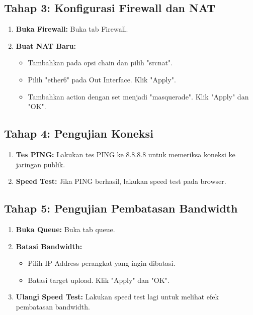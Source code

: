 \subsection*{Tahap 3: Konfigurasi Firewall dan NAT}

\begin{enumerate}
    \item \textbf{Buka Firewall:} Buka tab Firewall.
    \item \textbf{Buat NAT Baru:}
    \begin{itemize}
        \item Tambahkan pada opsi chain dan pilih "srcnat".
        \item Pilih "ether6" pada Out Interface. Klik "Apply".
        \item Tambahkan action dengan set menjadi "masquerade". Klik "Apply" dan "OK".
    \end{itemize}
\end{enumerate}

\subsection*{Tahap 4: Pengujian Koneksi}

\begin{enumerate}
    \item \textbf{Tes PING:} Lakukan tes PING ke 8.8.8.8 untuk memeriksa koneksi ke jaringan publik.
    \item \textbf{Speed Test:} Jika PING berhasil, lakukan speed test pada browser.
\end{enumerate}

\subsection*{Tahap 5: Pengujian Pembatasan Bandwidth}

\begin{enumerate}
    \item \textbf{Buka Queue:} Buka tab queue.
    \item \textbf{Batasi Bandwidth:}
    \begin{itemize}
        \item Pilih IP Address perangkat yang ingin dibatasi.
        \item Batasi target upload. Klik "Apply" dan "OK".
    \end{itemize}
    \item \textbf{Ulangi Speed Test:} Lakukan speed test lagi untuk melihat efek pembatasan bandwidth.
\end{enumerate}